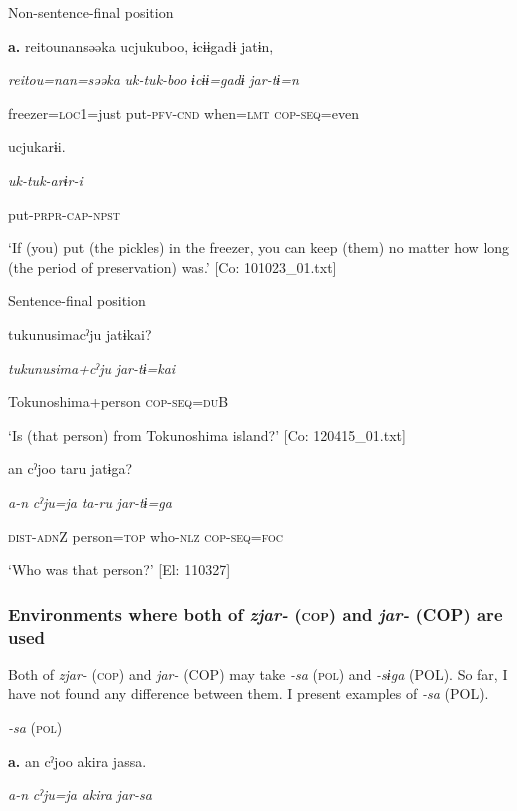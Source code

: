   Non-sentence-final position

  \textbf{a.}  {\TM}
\glll  {\textbar}reitou{\textbar}nansəəka  ucjukuboo,  ɨcɨɨgadɨ  jatɨn,

      \textit{reitou=nan=səəka}  \textit{uk-tuk-boo}  \textit{ɨcɨɨ=gadɨ}  \textit{jar-tɨ=n}

      freezer=\textsc{loc}1=just  put-\textsc{pfv}-\textsc{cnd}  when=\textsc{lmt}  \textsc{cop}-\textsc{seq}=even

      ucjukarɨi.

      \textit{uk-tuk-arɨr-i}

      put-\textsc{prpr}-\textsc{cap}-\textsc{npst}

\glt ‘If (you) put (the pickles) in the freezer, you can keep (them) no matter how long (the period of preservation) was.’ [Co: 101023\_01.txt]
\z

  Sentence-final position

\ex  {\TM}
\glll  tukunusimacˀju  jatɨkai?

      \textit{tukunusima+cˀju}  \textit{jar-tɨ=kai}

      Tokunoshima+person  \textsc{cop}-\textsc{seq}=\textsc{du}B

\glt ‘Is (that person) from Tokunoshima island?’ [Co: 120415\_01.txt]
\z

\ex  {\TM}
\glll  an  cˀjoo  taru  jatɨga?

      \textit{a-n}  \textit{cˀju=ja}  \textit{ta-ru}  \textit{jar-tɨ=ga}

      \textsc{dist}-\textsc{adn}Z  person=\textsc{top}  who-\textsc{nlz}  \textsc{cop}-\textsc{seq}=\textsc{foc}

\glt ‘Who was that person?’ [El: 110327]

\subsubsection{Environments where both of \textit{zjar-} (\textsc{cop}) and \textit{jar-} (COP) are used}

Both of \textit{zjar-} (\textsc{cop}) and \textit{jar-} (COP) may take \textit{{}-sa} (\textsc{pol}) and \textit{{}-sɨga} (POL). So far, I have not found any difference between them. I present examples of \textit{{}-sa} (POL).

\textbf{\ea\label{ex:8-45}
}  \textit{{}-sa} (\textsc{pol})

  \textbf{a.}  {\TM}
\glll  an  cˀjoo  akira  jassa.

      \textit{a-n}  \textit{cˀju=ja}  \textit{akira}  \textit{jar-sa}

